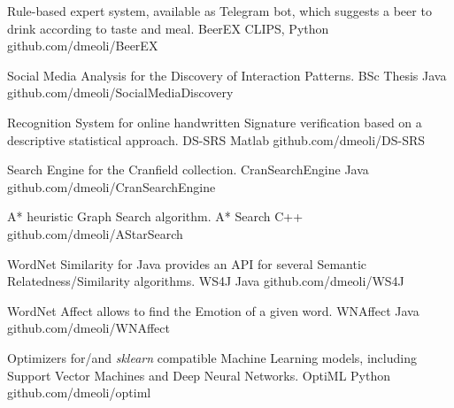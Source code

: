

\begin{cventries}

  \cventry
    {Rule-based expert system, available as Telegram bot, which suggests a beer to drink according to taste and meal.} %
    {BeerEX} %
    {CLIPS, Python} %
    {github.com/dmeoli/BeerEX} %
    {}

  \cventry
    {Social Media Analysis for the Discovery of Interaction Patterns.} %
    {BSc Thesis} %
    {Java} %
    {github.com/dmeoli/SocialMediaDiscovery} %
    {}

  \cventry
    {Recognition System for online handwritten Signature verification based on a descriptive statistical approach.} %
    {DS-SRS} %
    {Matlab} %
    {github.com/dmeoli/DS-SRS} %
    {}

  \cventry
    {Search Engine for the Cranfield collection.} %
    {CranSearchEngine} %
    {Java} %
    {github.com/dmeoli/CranSearchEngine} %
    {}

  \cventry
    {A* heuristic Graph Search algorithm.} %
    {A* Search} %
    {C++} %
    {github.com/dmeoli/AStarSearch} %
    {}

  \cventry
    {WordNet Similarity for Java provides an API for several Semantic Relatedness/Similarity algorithms.} %
    {WS4J} %
    {Java} %
    {github.com/dmeoli/WS4J} %
    {}

  \cventry
    {WordNet Affect allows to find the Emotion of a given word.} %
    {WNAffect} %
    {Java} %
    {github.com/dmeoli/WNAffect} %
    {}
    
  \cventry
    {Optimizers for/and \textit{sklearn} compatible Machine Learning models, including Support Vector Machines and Deep Neural Networks.} %
    {OptiML} %
    {Python} %
    {github.com/dmeoli/optiml} %
    {}
    
\end{cventries}
